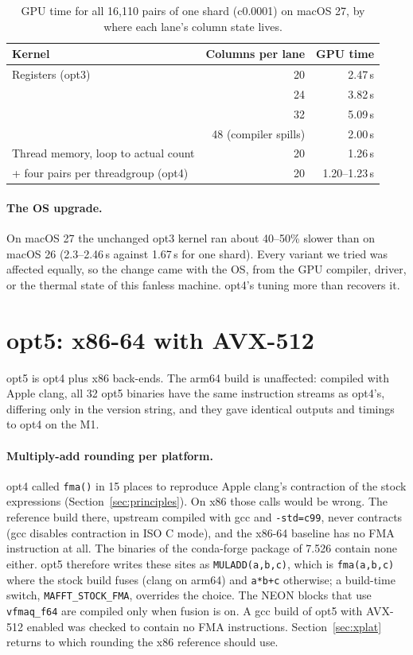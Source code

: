 \documentclass[11pt]{article}
\newcommand{\code}[1]{\texttt{#1}}
\begin{document}
\begin{table}[h]
\centering
\caption{GPU time for all 16{,}110 pairs of one shard (c0.0001) on macOS 27, by where
each lane's column state lives.}
\label{tab:occupancy}
\begin{tabular}{lrr}
\toprule
Kernel & Columns per lane & GPU time \\
\midrule
Registers (opt3) & 20 & 2.47\,s \\
                 & 24 & 3.82\,s \\
                 & 32 & 5.09\,s \\
                 & 48 (compiler spills) & 2.00\,s \\
Thread memory, loop to actual count & 20 & 1.26\,s \\
\quad + four pairs per threadgroup (opt4) & 20 & 1.20--1.23\,s \\
\bottomrule
\end{tabular}
\end{table}

\paragraph{The OS upgrade.} On macOS 27 the unchanged opt3 kernel ran about 40--50\% slower
than on macOS 26 (2.3--2.46\,s against 1.67\,s for one shard). Every variant we tried was
affected equally, so the change came with the OS, from the GPU compiler, driver, or the
thermal state of this fanless machine. opt4's tuning more than recovers it.
\label{sec:os}

\section{opt5: x86-64 with AVX-512}
\label{sec:opt5}

opt5 is opt4 plus x86 back-ends. The arm64 build is unaffected: compiled with Apple clang,
all 32 opt5 binaries have the same instruction streams as opt4's, differing only in the
version string, and they gave identical outputs and timings to opt4 on the M1.

\paragraph{Multiply-add rounding per platform.} opt4 called \code{fma()} in 15 places to
reproduce Apple clang's contraction of the stock expressions (Section~\ref{sec:principles}).
On x86 those calls would be wrong. The reference build there, upstream compiled with gcc and
\code{-std=c99}, never contracts (gcc disables contraction in ISO C mode), and the x86-64
baseline has no FMA instruction at all. The binaries of the conda-forge package of 7.526
contain none either. opt5 therefore writes these sites as
\code{MULADD(a,b,c)}, which is \code{fma(a,b,c)} where the stock build fuses (clang on arm64)
and \code{a*b+c} otherwise; a build-time switch, \code{MAFFT\_STOCK\_FMA}, overrides the
choice. The NEON blocks that use \code{vfmaq\_f64} are compiled only when fusion is on. A
gcc build of opt5 with AVX-512 enabled was checked to contain no FMA instructions.
Section~\ref{sec:xplat} returns to which rounding the x86 reference should use.
\end{document}
